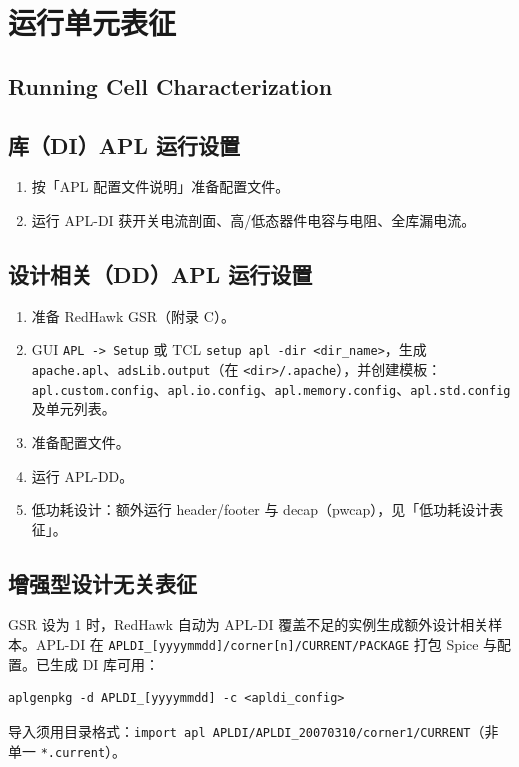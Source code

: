 \section{运行单元表征}
\subsection*{Running Cell Characterization}

\subsection{库（DI）APL 运行设置}
\begin{enumerate}
  \item 按「APL 配置文件说明」准备配置文件。
  \item 运行 APL-DI 获开关电流剖面、高/低态器件电容与电阻、全库漏电流。
\end{enumerate}

\subsection{设计相关（DD）APL 运行设置}
\begin{enumerate}
  \item 准备 RedHawk GSR（附录 C）。
  \item GUI \texttt{APL -> Setup} 或 TCL \texttt{setup apl -dir <dir\_name>}，生成 \texttt{apache.apl}、\texttt{adsLib.output}（在 \texttt{<dir>/.apache}），并创建模板：\texttt{apl.custom.config}、\texttt{apl.io.config}、\texttt{apl.memory.config}、\texttt{apl.std.config} 及单元列表。
  \item 准备配置文件。
  \item 运行 APL-DD。
  \item 低功耗设计：额外运行 header/footer 与 decap（pwcap），见「低功耗设计表征」。
\end{enumerate}

\subsection{增强型设计无关表征}
GSR  设为 1 时，RedHawk 自动为 APL-DI 覆盖不足的实例生成额外设计相关样本。APL-DI 在 \texttt{APLDI\_[yyyymmdd]/corner[n]/CURRENT/PACKAGE} 打包 Spice 与配置。已生成 DI 库可用：
\begin{lstlisting}
aplgenpkg -d APLDI_[yyyymmdd] -c <apldi_config>
\end{lstlisting}
导入须用目录格式：\texttt{import apl APLDI/APLDI\_20070310/corner1/CURRENT}（非单一 \texttt{*.current}）。

